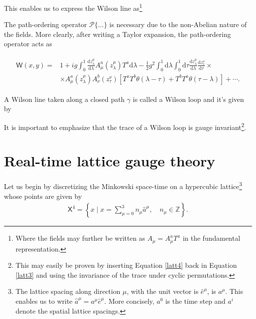 This enables us to express the {\sffamily\color{maincolor}Wilson line} as\footnote{Where the fields may further be written as $A_{\mu}=A_{\mu}^aT^a$ in the fundamental representation.}

\begin{remark}
The {\sffamily\color{maincolor}path-ordering} operator $\mathcal{P}\{\ldots\}$ is necessary due to the non-Abelian nature of the fields. More clearly, after writing a Taylor expansion, the path-ordering operator acts as

\begin{align*}
    \begin{aligned}
    \textsf{W}(x, y)=& 1+i g \int_{0}^{1} \frac{\mathrm{d} z^{\mu}_\lambda}{\mathrm{d} \lambda} A_{\mu}^{a}(z_\lambda^\mu) T^{a} \mathrm{d} \lambda-\frac{1}{2} g^{2} \int_{0}^{1} \mathrm{d} \lambda \int_{0}^{1} \mathrm{d} \tau \frac{\mathrm{d} z^{\mu}_\lambda}{\mathrm{d} \lambda} \frac{\mathrm{d} z^{\nu}_\tau}{\mathrm{d} \tau}\times\\
    & \times A_{\mu}^{a}(z_\lambda^\mu) A_{\nu}^{b}(z_\tau^\nu)\left[T^{a} T^{b} \theta(\lambda-\tau)+T^{b} T^{a} \theta(\tau-\lambda)\right]+\cdots.
\end{aligned}
\end{align*}
\end{remark}

A Wilson line taken along a closed path $\gamma$ is called a {\sffamily\color{maincolor}Wilson loop} and it's given by

It is important to emphasize that the trace of a Wilson loop is gauge invariant\footnote{This may easily be proven by inserting Equation \cref{latt4} back in Equation \cref{latt3} and using the invariance of the trace under cyclic permutations.}.

\section{Real-time lattice gauge theory} 
Let us begin by discretizing the Minkowski space-time on a hypercubic lattice\footnote{The lattice spacing along direction $\mu$, with the unit vector is $\hat{e}^\mu$, is $a^\mu$. This enables us to write $\hat{a}^{\mu}=a^\mu\hat{e}^\mu$. More concisely, $a^0$ is the time step and $a^i$ denote the spatial lattice spacings.} whose points are given by
\begin{align*}
    \textsf{X}^4=\left\{x \mid x=\sum_{\mu=0}^{3} n_{\mu} \hat{a}^{\mu}, \quad n_{\mu} \in \mathbb{Z}\right\}.
\end{align*}

